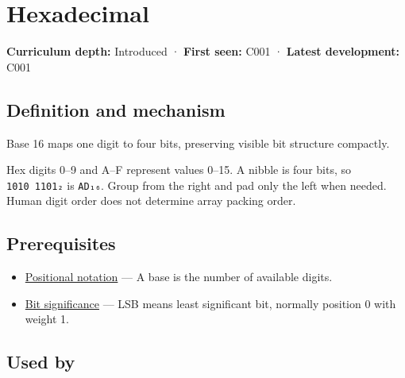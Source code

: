 \hypertarget{appendix-6b8075763724}{}\label{referencestart:appendix-6b8075763724}
\section{Hexadecimal}\label{appendix-6b8075763724-hexadecimal}

\hypertarget{appendix-6b8075763724-hexadecimal}{}

\textbf{Curriculum depth:} Introduced · \textbf{First seen:} C001 · \textbf{Latest development:} C001

\begin{allmightroledefinition}

\subsection{Definition and mechanism}\label{appendix-6b8075763724-definition-and-mechanism}

\hypertarget{appendix-6b8075763724-definition-and-mechanism}{}

Base 16 maps one digit to four bits, preserving visible bit structure compactly.

\end{allmightroledefinition}

Hex digits 0--9 and A--F represent values 0--15. A nibble is four bits, so \texttt{1010\ 1101₂} is \texttt{AD₁₆}. Group from the right and pad only the left when needed. Human digit order does not determine array packing order.

\subsection{Prerequisites}\label{appendix-6b8075763724-prerequisites}

\hypertarget{appendix-6b8075763724-prerequisites}{}

\begin{itemize}
\tightlist
\item
  \hyperref[appendix-83c3f28f7bda]{Positional notation} --- A base is the number of available digits.
\item
  \hyperref[appendix-280445746493]{Bit significance} --- LSB means least significant bit, normally position 0 with weight 1.
\end{itemize}

\subsection{Used by}\label{appendix-6b8075763724-used-by}

